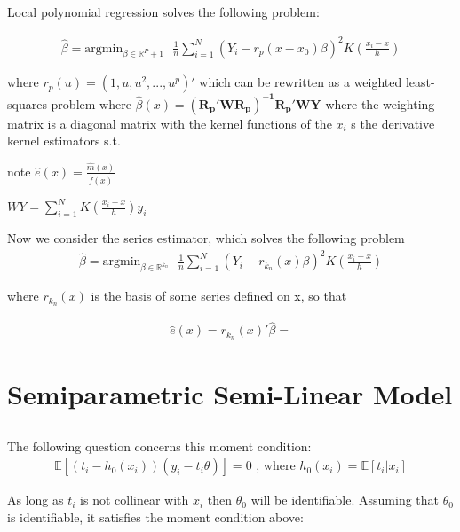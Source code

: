 \documentclass[12pt]{article}
\newcommand{\R}{\mathbb{R}}
\newcommand{\E}{\mathbb{E}}
\begin{document}
\subsection{}

Local polynomial regression solves the following problem:

\begin{gather*}
\hat{\beta} =  \text{argmin}_{\beta \in \R^P+1} \text{    } \frac{1}{n}\sum\limits_{i=1}^N \left(Y_i - r_p(x-x_0)\beta  \right)^2 K(\frac{x_i - x}{h})
\end{gather*}

where $ r_p(u) =(1,u,u^2,...,u^p)' $ which can be rewritten as a weighted least-squares problem where $ \hat{\beta}(x) = \mathbf{ (R_p' W R_p)^{-1} R_p'WY }$  where the weighting matrix is a diagonal matrix with the kernel functions of the $ x_i $ s  the derivative kernel estimators s.t.

note $\hat{e}(x) = \frac{\hat{m}(x)}{\hat{f}(x)}$

$ WY = \sum\limits_{i=1}^N K(\frac{x_i - x}{h}) y_i$


Now we consider the series estimator, which solves the following problem
\begin{gather*}
\hat{\beta} =  \text{argmin}_{\beta \in \R^{k_n}} \text{    } \frac{1}{n}\sum\limits_{i=1}^N \left(Y_i - r_{k_n}(x)\beta  \right)^2 K(\frac{x_i - x}{h})
\end{gather*}

where $r_{k_n}(x)$ is the basis of some series defined on x, so that

\begin{gather*}
\hat{e}(x) = r_{k_n}(x)'\hat{\beta} =
\end{gather*}


\newpage
\section{Semiparametric Semi-Linear Model}
\subsection{}

The following question concerns this moment condition:
\begin{gather*}
\E[(t_i - h_0(x_i))(y_i - t_i\theta)] = 0 \text{  , where }  h_0(x_i) = \E[t_i | x_i]
\end{gather*}

As long as $t_i$ is not collinear with $x_i$ then $\theta_0$ will be identifiable. Assuming that $\theta_0$ is identifiable, it satisfies the moment condition above:
\end{document}
